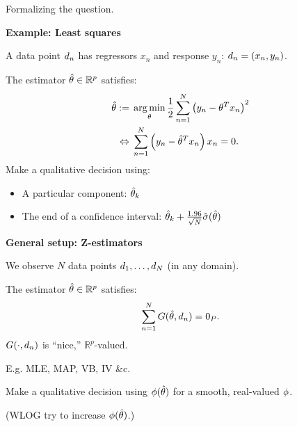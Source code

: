 

\begin{frame}[t]{Formalizing the question.}

\begin{minipage}[t]{0.45\textwidth}
\textbf{Example: Least squares}

\pause
\vspace{1em}
A data point $d_n$ has regressors
$x_n$ and response $y_n$: $d_n = (x_n, y_n)$.

\pause
\vspace{1em}
The estimator $\hat{\theta} \in \mathbb{R}^p$ satisfies:
%
\begin{align*}
%
\thetahat :={}&
    \argmin_{\theta} \frac{1}{2} \sumn \left(y_n - \theta^T x_n \right)^{2} \\
\Leftrightarrow{}& \sumn \left(y_n - \thetahat^T x_n \right) x_n = 0.
%
\end{align*}
%
\pause
Make a qualitative decision using:\vspace{-1.5em}
\begin{itemize}
\item A particular component: $\hat{\theta}_k$
\item The end of a confidence interval:
    $\hat{\theta}_k + \frac{1.96}{\sqrt{N}} \hat\sigma(\hat{\theta})$
\end{itemize}
%
\end{minipage}
%
\pause
\hfill\vline\hfill
%
\begin{minipage}[t]{0.45\textwidth}
\textbf{General setup: Z-estimators}

\pause
\vspace{1em}
We observe $N$ data points $d_{1}, \ldots, d_{N}$
(in any domain).

\pause
\vspace{1em}
The estimator $\hat{\theta} \in \mathbb{R}^p$ satisfies:
%
\begin{align*}
%
\sumn
G(\thetahat, \d_{n}) =  \zP.
%
\end{align*}
%
$G(\cdot, d_{n})$ is ``nice,'' $\mathbb{R}^p$-valued.

E.g. MLE, MAP, VB, IV \&c.

\pause
\vspace{1em}
Make a qualitative decision using $\phi(\hat{\theta})$
for a smooth, real-valued $\phi$.

\vspace{1em}
(WLOG try to increase $\phi(\hat{\theta})$.)
%
\end{minipage}

\end{frame}





